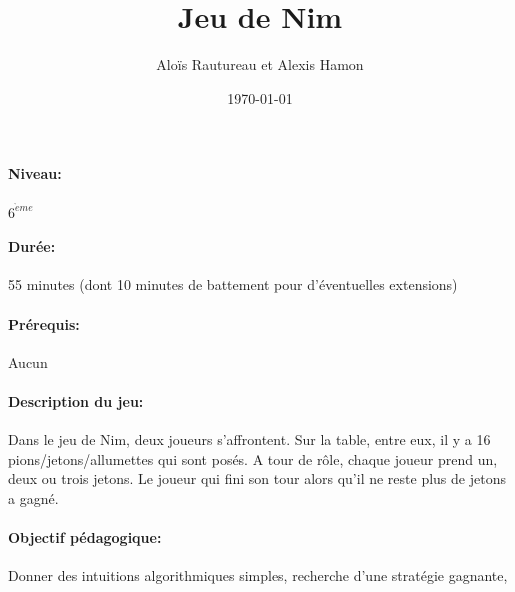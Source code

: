 \documentclass[12pt, a4paper]{article}
\begin{document}
\title{Jeu de Nim}
\author{Aloïs Rautureau et Alexis Hamon}
\date{\today}
\maketitle
\paragraph*{Niveau:} $6^{\grave{e}me}$
\paragraph*{Durée:} 55 minutes (dont 10 minutes de battement pour d'éventuelles extensions)
\paragraph*{Prérequis:} Aucun
\paragraph*{Description du jeu:}
Dans le jeu de Nim, deux joueurs s'affrontent. Sur la table, entre eux, il y a 16 pions/jetons/allumettes
qui sont posés. A tour de rôle, chaque joueur prend un, deux ou trois jetons.
Le joueur qui fini son tour alors qu'il ne reste plus de jetons a gagné.
\paragraph*{Objectif pédagogique:}
Donner des intuitions algorithmiques simples, recherche d'une stratégie gagnante,
\end{document}
